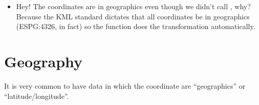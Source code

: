 \documentclass[a4paper,11pt,english]{sphinxmanual}
\begin{document}
\begin{itemize}
\begin{sphinxadmonition}{note}{Note:}
The difference between the UTM 18 and the State Plane Long Island measurements is (10421993 - 10418904)/10418904, or 0.02\%. Calculated on the spheroid using  the total street length is 10421999, which is closer to the State Plane value. This is not surprising, since the State Plane Long Island projection is precisely calibrated for a very small area (New York City) while UTM 18 has to provide reasonable results for a large regional area.
\end{sphinxadmonition}

\item {} 

\begin{sphinxVerbatim}[commandchars=\\\{\}]
 
 
   
\end{sphinxVerbatim}

\begin{sphinxVerbatim}[commandchars=\\\{\}]
\end{sphinxVerbatim}

Hey! The coordinates are in geographics even though we didn’t call , why? Because the KML standard dictates that all coordinates  be in geographics (ESPG:4326, in fact) so the  function does the transformation automatically.

\end{itemize}


\section{Geography}
\label{\detokenize{basic:geography}}\label{\detokenize{basic:id27}}
It is very common to have data in which the coordinate are “geographics” or “latitude/longitude”.
\end{document}
